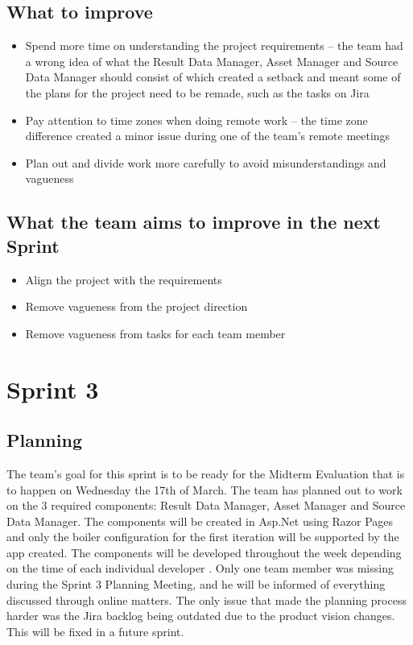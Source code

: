\documentclass[12pt]{report}
\begin{document}
\subsection*{What to improve}
\begin{itemize}
    \item Spend more time on understanding the project requirements -- the team had a wrong idea of what the Result Data Manager, Asset Manager and Source Data Manager should consist of which created a setback and meant some of the plans for the project need to be remade, such as the tasks on Jira
    \item Pay attention to time zones when doing remote work -- the time zone difference created a minor issue during one of the team's remote meetings
    \item Plan out and divide work more carefully to avoid misunderstandings and vagueness
\end{itemize}

\subsection*{What the team aims to improve in the next Sprint}
\begin{itemize}
    \item Align the project with the requirements
    \item Remove vagueness from the project direction
    \item Remove vagueness from tasks for each team member
\end{itemize}






\section{Sprint 3}
\subsection*{Planning}
The team's goal for this sprint is to be ready for the Midterm Evaluation that is to happen on
Wednesday the 17th of March. The team has planned out to work on the 3 required components:
Result Data Manager, Asset Manager and Source Data Manager. The components will be created in
Asp.Net using Razor Pages and only the boiler configuration for the first iteration will be supported
by the app created. The components will be developed throughout the week depending on the time
of each individual developer . Only one team member was missing during the Sprint 3 Planning
Meeting, and he will be informed of everything discussed through online matters. The only issue that
made the planning process harder was the Jira backlog being outdated due to the product vision
changes. This will be fixed in a future sprint.
\end{document}
